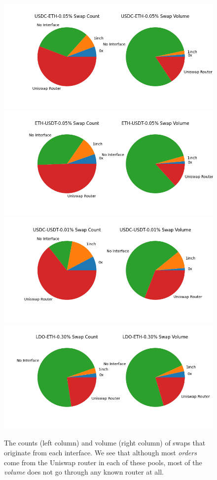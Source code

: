 \begin{figure}[ht]
    \centering
    \includegraphics[scale=.43]{figs/swap-sources/USDC-ETH-0.05.png}
    \includegraphics[scale=.43]{figs/swap-sources/ETH-USDT-0.05.png}
    \includegraphics[scale=.43]{figs/swap-sources/USDC-USDT-0.01.png}
    \includegraphics[scale=.43]{figs/swap-sources/LDO-ETH-0.30.png}    
    \caption{The counts (left column) and volume (right column) of swaps that originate from each interface. We see that although most \textit{orders} come from the Uniswap router in each of these pools, most of the \textit{volume} does not go through any known router at all.}
\end{figure}

